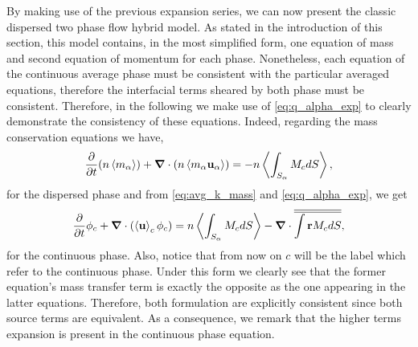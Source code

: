 By making use of the previous expansion series, we can now present the classic dispersed two phase flow hybrid model. 
As stated in the introduction of this section, this model contains, in the most simplified form, one equation of mass and second equation of momentum for each phase. 
Nonetheless, each equation of the continuous average phase must be consistent with the particular averaged equations, therefore the interfacial terms sheared by both phase must be consistent. 
Therefore, in the following we make use of \ref{eq:q_alpha_exp} to clearly demonstrate the consistency of these equations. 
Indeed, regarding the mass conservation equations we have,
\begin{equation}
    \frac{\partial}{\partial t} (n \left<m_\alpha\right>)
    + \bm{\nabla} \cdot \left(n \left<m_\alpha\textbf{u}_\alpha\right>\right) 
    = 
    - n \left<\int_{S_\alpha} M_c dS\right>,
    \label{eq:classic_hybrid_mass_p}
\end{equation}
for the dispersed phase and from \ref{eq:avg_k_mass} and \ref{eq:q_alpha_exp}, we get
\begin{equation}
    \frac{\partial}{\partial t} \phi_c 
    + \bm{\nabla} \cdot \left(
        \left<\textbf{u}\right>_c\phi_c 
    \right) 
    =  n \left<\int_{S_\alpha} M_c dS\right> - \bm{\nabla} \cdot \overline{\overline{\int \textbf{r} M_c dS}},
    \label{eq:classic_hybrid_mass_c}
\end{equation}
for the continuous phase. 
Also, notice that from now on $c$ will be the label which refer to the continuous phase.
Under this form we clearly see that the former equation's mass transfer term is exactly the opposite as the one appearing in the latter equations. 
Therefore, both formulation are explicitly consistent since both source terms are equivalent. 
As a consequence, we remark that the higher terms expansion is present in the continuous phase equation. 

